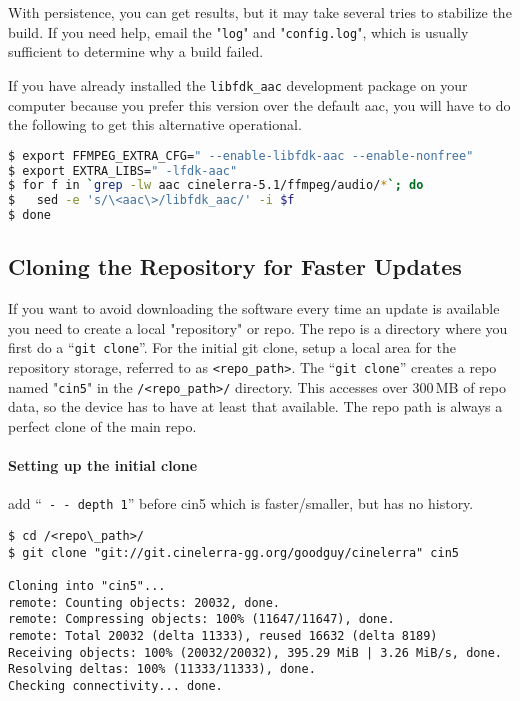 With persistence, you can get results, but it may take several tries to stabilize the build.  
If you need help, email the "\texttt{log}" and "\texttt{config.log}", which is usually sufficient to determine why a build failed.
\vspace{5ex}

If you have already installed the \texttt{libfdk\_aac} development package on your computer because you prefer this version over the default aac, you will have to do the following to get this alternative operational.

\begin{lstlisting}[language=bash]
$ export FFMPEG_EXTRA_CFG=" --enable-libfdk-aac --enable-nonfree"
$ export EXTRA_LIBS=" -lfdk-aac"
$ for f in `grep -lw aac cinelerra-5.1/ffmpeg/audio/*`; do
$   sed -e 's/\<aac\>/libfdk_aac/' -i $f
$ done
\end{lstlisting}

\subsection{Cloning the Repository for Faster Updates}%
\label{sub:cloning_the_repository_for_faster_updates}

If you want to avoid downloading the software every time an update is available you need to create a local "repository" or repo.  
The repo is a directory where you first do a “\texttt{git clone}”.  
For the initial git clone, setup a local area for the repository storage, referred to as \texttt{<repo\_path>}.  
The “\texttt{git clone}” creates a repo named "\texttt{cin5}" in the \texttt{/<repo\_path>/} directory.  
This accesses over 300\,MB of repo data, so the device has to have at least that available.  
The repo path is always a perfect clone of the main repo.

\paragraph{Setting up the initial clone}%
\label{par:setting_up_the_initial_clone}
add “\texttt{ -\,- depth 1}” before cin5 which is faster/smaller, but has no history.

\begin{lstlisting}
$ cd /<repo\_path>/
$ git clone "git://git.cinelerra-gg.org/goodguy/cinelerra" cin5

Cloning into "cin5"...
remote: Counting objects: 20032, done.
remote: Compressing objects: 100% (11647/11647), done.
remote: Total 20032 (delta 11333), reused 16632 (delta 8189)
Receiving objects: 100% (20032/20032), 395.29 MiB | 3.26 MiB/s, done.
Resolving deltas: 100% (11333/11333), done.
Checking connectivity... done.
\end{lstlisting}

